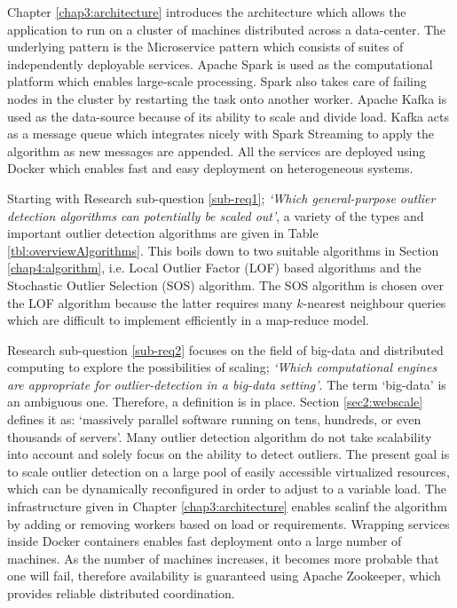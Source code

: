 Chapter \ref{chap3:architecture} introduces the architecture which allows the application to run on a cluster of machines distributed across a data-center. The underlying pattern is the Microservice pattern which consists of suites of independently deployable services. Apache Spark is used as the computational platform which enables large-scale processing. Spark also takes care of failing nodes in the cluster by restarting the task onto another worker. Apache Kafka is used as the data-source because of its ability to scale and divide load. Kafka acts as a message queue which integrates nicely with Spark Streaming to apply the algorithm as new messages are appended. All the services are deployed using Docker which enables fast and easy deployment on heterogeneous systems.

Starting with Research sub-question \ref{sub-req1}; \emph{`Which general-purpose outlier detection algorithms can potentially be scaled out'}, a variety of the types and important outlier detection algorithms are given in Table \ref{tbl:overviewAlgorithms}. This boils down to two suitable algorithms in Section \ref{chap4:algorithm}, i.e. Local Outlier Factor (LOF) based algorithms and the Stochastic Outlier Selection (SOS) algorithm. The SOS algorithm is chosen over the LOF algorithm because the latter requires many $k$-nearest neighbour queries which are difficult to implement efficiently in a map-reduce model.

Research sub-question \ref{sub-req2} focuses on the field of big-data and distributed computing to explore the possibilities of scaling; \emph{`Which computational engines are appropriate for outlier-detection in a big-data setting'}. The term `big-data' is an ambiguous one. Therefore, a definition is in place. Section \ref{sec2:webscale} defines it as: `massively parallel software running on tens, hundreds, or even thousands of servers'. Many outlier detection algorithm do not take scalability into account and solely focus on the ability to detect outliers. The present goal is to scale outlier detection on a large pool of easily accessible virtualized resources, which can be dynamically reconfigured in order to adjust to a variable load. The infrastructure given in Chapter \ref{chap3:architecture} enables scalinf the algorithm by adding or removing workers based on load or requirements. Wrapping services inside Docker containers enables fast deployment onto a large number of machines. As the number of machines increases, it becomes more probable that one will fail, therefore availability is guaranteed using Apache Zookeeper, which provides reliable distributed coordination.


